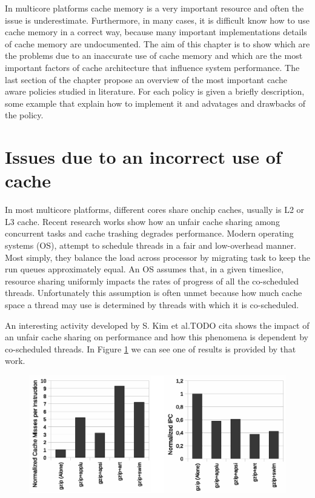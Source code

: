 In multicore platforms cache memory is a very important resource and often the issue is underestimate. Furthermore, in many cases, it is difficult know 
how to use cache memory in a correct way, because many important implementations details of cache memory are undocumented. The aim of this chapter is 
to show which are the problems due to an inaccurate use of cache memory and which are the most important factors of cache architecture that influence 
system performance. The last section of the chapter propose an overview of the most important cache aware policies studied in literature. For each policy 
is given a briefly description, some example that explain how to implement it and advatages and drawbacks of the policy.

\section{Issues due to an incorrect use of cache}
\label{sec:s1}

In most multicore platforms, different cores share onchip caches, usually is L2 or L3 cache. Recent research works show how an unfair cache sharing
among concurrent tasks and cache trashing degrades performance. Modern operating systems (OS), attempt to schedule threads in a
fair and low-overhead manner.
Most simply, they balance the load across processor by migrating task to keep the run queues approximately equal. An OS assumes that,
in a given timeslice, resource sharing uniformly impacts the rates of progress of all the co-scheduled threads.
Unfortunately this assumption is often unmet because how much cache space a thread may use is determined by threads with which it is co-scheduled.

An interesting activity developed by S. Kim et al.TODO cita shows the impact of an unfair cache sharing on performance and how this phenomena is dependent by
co-scheduled threads. In Figure \ref{fig:gzip_miss} we can see one of results is provided by that work.

\begin{figure}[htbp]
\centering
\includegraphics[width=\widefigure]{images/chandra_gzip}
\caption{}
\label{fig:gzip_miss}
\end{figure}

